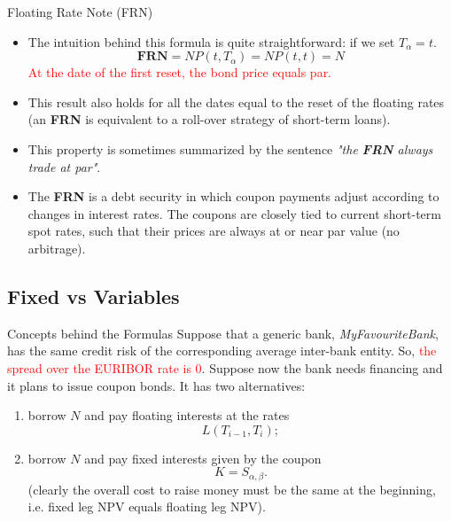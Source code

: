 \documentclass{beamer}
\begin{document}
\begin{frame}{Floating Rate Note (FRN)}
	\begin{itemize}
	\item The intuition behind this formula is quite straightforward: if we set $T_\alpha =t$. 
	\begin{equation*}
		\textbf{FRN} = N P(t, T_\alpha) = N P(t, t) = N
	\end{equation*}
	\textcolor{red}{At the date of the first reset, the bond price equals par.} 
	\item This result also holds for all the dates equal to the reset of the floating rates (an \textbf{FRN} is equivalent to a roll-over strategy of short-term loans).
	\item This property is sometimes summarized by the sentence \emph{"the \textbf{FRN} always trade at par"}.
	\item The \textbf{FRN} is a debt security in which coupon payments adjust according to changes in interest rates. The coupons are closely tied to current short-term spot rates, such that their prices are always at or near par value (no arbitrage). 
	\end{itemize}
\end{frame}

\subsection{Fixed vs Variables}
\begin{frame}{Concepts behind the Formulas}
	Suppose that a generic bank, \emph{MyFavouriteBank}, has the same credit risk of the corresponding average inter-bank entity. So, \textcolor{red}{the spread over the EURIBOR rate is 0}. Suppose now the bank needs financing and it plans to issue coupon bonds. It has two alternatives:
	\begin{enumerate}
		\item<1-> borrow $N$ and pay floating interests at the rates
		\begin{equation*}
			L(T_{i-1},T_i);
		\end{equation*}
		\item<1-> borrow $N$ and pay fixed interests given by the coupon
		\begin{equation*}
			K = S_{\alpha,\beta}.
		\end{equation*}
		(clearly the overall cost to raise money must be the same at the beginning, i.e. fixed leg NPV equals floating leg NPV).
	\end{enumerate}
\end{frame}
\end{document}

